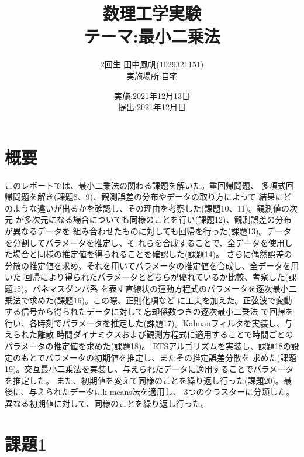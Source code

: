 \documentclass[10pt, a4paper, titlepage]{jarticle}
\begin{document}
\title{数理工学実験 \\テーマ:最小二乗法}
\author{2回生 \quad 田中風帆(1029321151)　\\実施場所:自宅}
\date{実施:2021年12月13日\\提出:2021年12月日}

\maketitle
\setcounter{page}{0}
\tableofcontents
\clearpage
\listoffigures
\clearpage
\listoftables
\clearpage

\part{概要}
このレポートでは、最小二乗法の関わる課題を解いた。重回帰問題、
多項式回帰問題を解き(課題8、9)、観測誤差の分布やデータの取り方によって
結果にどのような違いが出るかを確認し、その理由を考察した(課題10、11)。観測値の次元
が多次元になる場合についても同様のことを行い(課題12)、観測誤差の分布が異なるデータを
組み合わせたものに対しても回帰を行った(課題13)。データを分割してパラメータを推定し、そ
れらを合成することで、全データを使用した場合と同様の推定値を得られることを確認した(課題14)。
さらに偶然誤差の分散の推定値を求め、それを用いてパラメータの推定値を合成し、全データを用いた
回帰により得られたパラメータとどちらが優れているか比較、考察した(課題15)。バネマスダンパ系
を表す直線状の運動方程式のパラメータを逐次最小二乗法で求めた(課題16)。この際、正則化項など
に工夫を加えた。正弦波で変動する信号から得られたデータに対して忘却係数つきの逐次最小二乗法
で回帰を行い、各時刻でパラメータを推定した(課題17)。Kalmanフィルタを実装し、与えられた離散
時間ダイナミクスおよび観測方程式に適用することで時間ごとのパラメータの推定値を求めた(課題18)。
RTSアルゴリズムを実装し、課題18の設定のもとでパラメータの初期値を推定し、またその推定誤差分散を
求めた(課題19)。交互最小二乗法を実装し、与えられたデータに適用することでパラメータを推定した。
また、初期値を変えて同様のことを繰り返し行った(課題20)。最後に、与えられたデータにk-means法を適用し、
3つのクラスターに分類した。異なる初期値に対して、同様のことを繰り返し行った。
\clearpage
\part{課題1}
\end{document}
